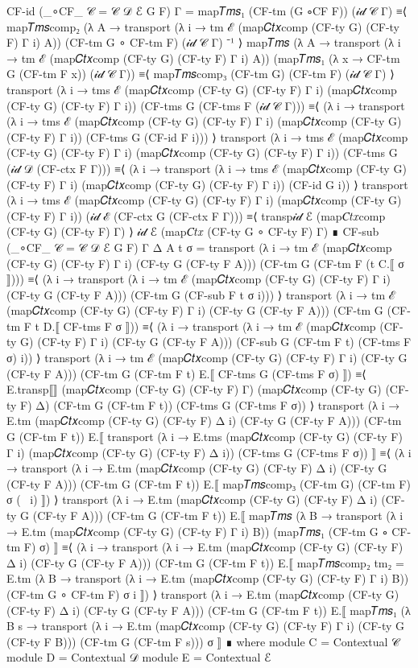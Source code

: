 \begin{code}[hide]
CF-id (_∘CF_ {𝒞 = 𝒞} {𝒟} {ℰ} G F) {Γ} =
  map𝑇𝑚𝑠₁ (CF-tm (G ∘CF F)) (𝒾𝒹 𝒞 Γ)
    ≡⟨ map𝑇𝑚𝑠comp₂ (λ {A} → transport (λ i → tm ℰ (map𝐶𝑡𝑥comp (CF-ty G) (CF-ty F) Γ i) A))
      (CF-tm G ∘ CF-tm F) (𝒾𝒹 𝒞 Γ) ⁻¹ ⟩
  map𝑇𝑚𝑠 (λ {A} → transport (λ i → tm ℰ (map𝐶𝑡𝑥comp (CF-ty G) (CF-ty F) Γ i) A))
    (map𝑇𝑚𝑠₁ (λ x → CF-tm G (CF-tm F x)) (𝒾𝒹 𝒞 Γ))
    ≡⟨ map𝑇𝑚𝑠comp₃ (CF-tm G) (CF-tm F) (𝒾𝒹 𝒞 Γ) ⟩
  transport (λ i → tms ℰ (map𝐶𝑡𝑥comp (CF-ty G) (CF-ty F) Γ i) (map𝐶𝑡𝑥comp (CF-ty G) (CF-ty F) Γ i))
    (CF-tms G (CF-tms F (𝒾𝒹 𝒞 Γ)))
    ≡⟨ (λ i → transport (λ i → tms ℰ (map𝐶𝑡𝑥comp (CF-ty G) (CF-ty F) Γ i)
      (map𝐶𝑡𝑥comp (CF-ty G) (CF-ty F) Γ i)) (CF-tms G (CF-id F i))) ⟩
  transport (λ i → tms ℰ (map𝐶𝑡𝑥comp (CF-ty G) (CF-ty F) Γ i) (map𝐶𝑡𝑥comp (CF-ty G) (CF-ty F) Γ i))
    (CF-tms G (𝒾𝒹 𝒟 (CF-ctx F Γ)))
    ≡⟨ (λ i → transport (λ i → tms ℰ (map𝐶𝑡𝑥comp (CF-ty G) (CF-ty F) Γ i)
      (map𝐶𝑡𝑥comp (CF-ty G) (CF-ty F) Γ i)) (CF-id G i)) ⟩
  transport (λ i → tms ℰ (map𝐶𝑡𝑥comp (CF-ty G) (CF-ty F) Γ i) (map𝐶𝑡𝑥comp (CF-ty G) (CF-ty F) Γ i))
    (𝒾𝒹 ℰ (CF-ctx G (CF-ctx F Γ)))
    ≡⟨ transp𝒾𝒹 ℰ (map𝐶𝑡𝑥comp (CF-ty G) (CF-ty F) Γ) ⟩
  𝒾𝒹 ℰ (map𝐶𝑡𝑥 (CF-ty G ∘ CF-ty F) Γ)
    ∎
CF-sub (_∘CF_ {𝒞 = 𝒞} {𝒟} {ℰ} G F) {Γ} {Δ} {A} t σ =
  transport (λ i → tm ℰ (map𝐶𝑡𝑥comp (CF-ty G) (CF-ty F) Γ i) (CF-ty G (CF-ty F A)))
    (CF-tm G (CF-tm F (t C.⟦ σ ⟧)))
    ≡⟨ (λ i → transport (λ i → tm ℰ (map𝐶𝑡𝑥comp (CF-ty G) (CF-ty F) Γ i) (CF-ty G (CF-ty F A)))
      (CF-tm G (CF-sub F t σ i))) ⟩
  transport (λ i → tm ℰ (map𝐶𝑡𝑥comp (CF-ty G) (CF-ty F) Γ i) (CF-ty G (CF-ty F A)))
    (CF-tm G (CF-tm F t D.⟦ CF-tms F σ ⟧))
    ≡⟨ (λ i → transport (λ i → tm ℰ (map𝐶𝑡𝑥comp (CF-ty G) (CF-ty F) Γ i) (CF-ty G (CF-ty F A)))
      (CF-sub G (CF-tm F t) (CF-tms F σ) i)) ⟩
  transport (λ i → tm ℰ (map𝐶𝑡𝑥comp (CF-ty G) (CF-ty F) Γ i) (CF-ty G (CF-ty F A)))
    (CF-tm G (CF-tm F t) E.⟦ CF-tms G (CF-tms F σ) ⟧)
    ≡⟨ E.transp⟦⟧ (map𝐶𝑡𝑥comp (CF-ty G) (CF-ty F) Γ) (map𝐶𝑡𝑥comp (CF-ty G) (CF-ty F) Δ)
      (CF-tm G (CF-tm F t)) (CF-tms G (CF-tms F σ)) ⟩
  transport (λ i → E.tm (map𝐶𝑡𝑥comp (CF-ty G) (CF-ty F) Δ i) (CF-ty G (CF-ty F A)))
    (CF-tm G (CF-tm F t)) E.⟦ transport (λ i → E.tms (map𝐶𝑡𝑥comp (CF-ty G) (CF-ty F) Γ i)
      (map𝐶𝑡𝑥comp (CF-ty G) (CF-ty F) Δ i)) (CF-tms G (CF-tms F σ)) ⟧
    ≡⟨ (λ i → transport (λ i → E.tm (map𝐶𝑡𝑥comp (CF-ty G) (CF-ty F) Δ i) (CF-ty G (CF-ty F A)))
      (CF-tm G (CF-tm F t)) E.⟦ map𝑇𝑚𝑠comp₃ (CF-tm G) (CF-tm F) σ (~ i) ⟧) ⟩
  transport (λ i → E.tm (map𝐶𝑡𝑥comp (CF-ty G) (CF-ty F) Δ i) (CF-ty G (CF-ty F A)))
    (CF-tm G (CF-tm F t)) E.⟦ map𝑇𝑚𝑠 (λ {B} → transport
      (λ i → E.tm (map𝐶𝑡𝑥comp (CF-ty G) (CF-ty F) Γ i) B)) (map𝑇𝑚𝑠₁ (CF-tm G ∘ CF-tm F) σ) ⟧
    ≡⟨ (λ i → transport (λ i → E.tm (map𝐶𝑡𝑥comp (CF-ty G) (CF-ty F) Δ i) (CF-ty G (CF-ty F A)))
      (CF-tm G (CF-tm F t)) E.⟦ map𝑇𝑚𝑠comp₂ {tm₂ = E.tm} (λ {B} → transport
        (λ i → E.tm (map𝐶𝑡𝑥comp (CF-ty G) (CF-ty F) Γ i) B)) (CF-tm G ∘ CF-tm F) σ i ⟧) ⟩
  transport (λ i → E.tm (map𝐶𝑡𝑥comp (CF-ty G) (CF-ty F) Δ i) (CF-ty G (CF-ty F A)))
    (CF-tm G (CF-tm F t)) E.⟦ map𝑇𝑚𝑠₁ (λ {B} s → transport
      (λ i → E.tm (map𝐶𝑡𝑥comp (CF-ty G) (CF-ty F) Γ i) (CF-ty G (CF-ty F B)))
      (CF-tm G (CF-tm F s))) σ ⟧
    ∎ where
    module C = Contextual 𝒞
    module D = Contextual 𝒟
    module E = Contextual ℰ
\end{code}
